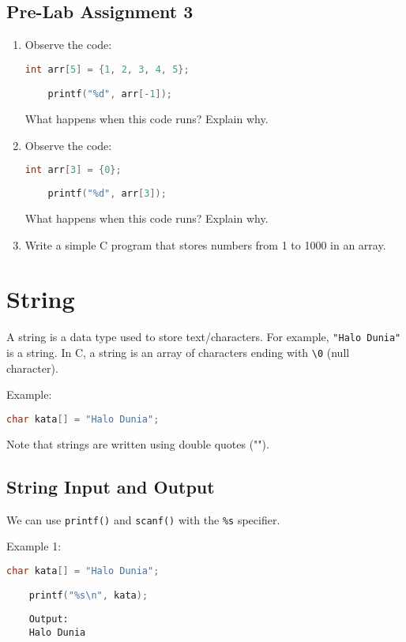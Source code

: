 \subsection*{Pre-Lab Assignment 3}
\begin{enumerate}
	\item Observe the code:
	\begin{lstlisting}[language=c]
	int arr[5] = {1, 2, 3, 4, 5};

	printf("%d", arr[-1]);
\end{lstlisting}
	What happens when this code runs? Explain why.
	
	\item Observe the code:
	\begin{lstlisting}[language=c]
	int arr[3] = {0};
	
	printf("%d", arr[3]);
\end{lstlisting}
	What happens when this code runs? Explain why.
	
	\item Write a simple C program that stores numbers from 1 to 1000 in an array.
\end{enumerate}

\section{String}

A string is a data type used to store text/characters.  
For example, \verb|"Halo Dunia"| is a string.  
In C, a string is an array of characters ending with \verb|\0| (null character).

Example:
\begin{lstlisting}[language=c]
	char kata[] = "Halo Dunia";
\end{lstlisting}

Note that strings are written using double quotes ("").

\subsection{String Input and Output}

We can use \verb|printf()| and \verb|scanf()| with the \verb|%s| specifier.

Example 1:
\begin{lstlisting}[language=c]
	char kata[] = "Halo Dunia";

	printf("%s\n", kata);
\end{lstlisting}
\begin{verbatim}
	Output:
	Halo Dunia
\end{verbatim}

